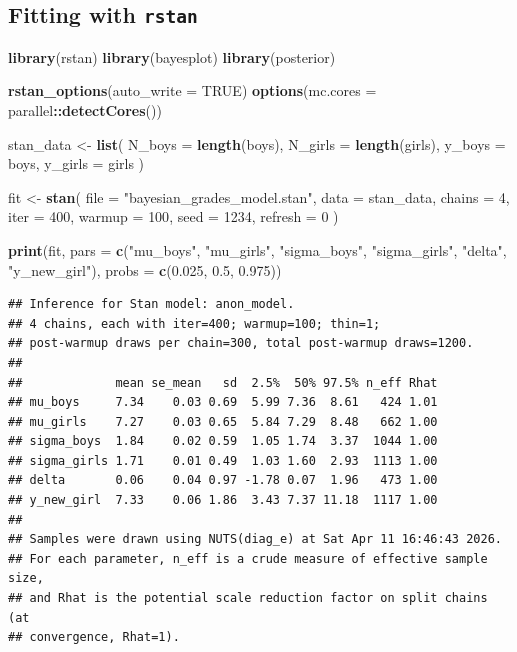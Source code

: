 \documentclass[
  english,
  12pt,
]{article}
\newenvironment{Shaded}{\begin{snugshade}}{\end{snugshade}}
\newcommand{\AttributeTok}[1]{\textcolor[rgb]{0.13,0.29,0.53}{#1}}
\newcommand{\ConstantTok}[1]{\textcolor[rgb]{0.56,0.35,0.01}{#1}}
\newcommand{\DecValTok}[1]{\textcolor[rgb]{0.00,0.00,0.81}{#1}}
\newcommand{\FloatTok}[1]{\textcolor[rgb]{0.00,0.00,0.81}{#1}}
\newcommand{\FunctionTok}[1]{\textcolor[rgb]{0.13,0.29,0.53}{\textbf{#1}}}
\newcommand{\NormalTok}[1]{#1}
\newcommand{\OtherTok}[1]{\textcolor[rgb]{0.56,0.35,0.01}{#1}}
\newcommand{\SpecialCharTok}[1]{\textcolor[rgb]{0.81,0.36,0.00}{\textbf{#1}}}
\newcommand{\StringTok}[1]{\textcolor[rgb]{0.31,0.60,0.02}{#1}}
\begin{document}
\subsection{\texorpdfstring{Fitting with
\texttt{rstan}}{Fitting with rstan}}\label{fitting-with-rstan}

\begin{Shaded}
\begin{Highlighting}[]
\FunctionTok{library}\NormalTok{(rstan)}
\FunctionTok{library}\NormalTok{(bayesplot)}
\FunctionTok{library}\NormalTok{(posterior)}

\FunctionTok{rstan\_options}\NormalTok{(}\AttributeTok{auto\_write =} \ConstantTok{TRUE}\NormalTok{)}
\FunctionTok{options}\NormalTok{(}\AttributeTok{mc.cores =}\NormalTok{ parallel}\SpecialCharTok{::}\FunctionTok{detectCores}\NormalTok{())}

\NormalTok{stan\_data }\OtherTok{\textless{}{-}} \FunctionTok{list}\NormalTok{(}
  \AttributeTok{N\_boys  =} \FunctionTok{length}\NormalTok{(boys),}
  \AttributeTok{N\_girls =} \FunctionTok{length}\NormalTok{(girls),}
  \AttributeTok{y\_boys  =}\NormalTok{ boys,}
  \AttributeTok{y\_girls =}\NormalTok{ girls}
\NormalTok{)}

\NormalTok{fit }\OtherTok{\textless{}{-}} \FunctionTok{stan}\NormalTok{(}
  \AttributeTok{file =} \StringTok{"bayesian\_grades\_model.stan"}\NormalTok{,}
  \AttributeTok{data =}\NormalTok{ stan\_data,}
  \AttributeTok{chains =} \DecValTok{4}\NormalTok{,}
  \AttributeTok{iter =} \DecValTok{400}\NormalTok{,}
  \AttributeTok{warmup =} \DecValTok{100}\NormalTok{,}
  \AttributeTok{seed =} \DecValTok{1234}\NormalTok{,}
  \AttributeTok{refresh =} \DecValTok{0}
\NormalTok{)}

\FunctionTok{print}\NormalTok{(fit, }\AttributeTok{pars =} \FunctionTok{c}\NormalTok{(}\StringTok{"mu\_boys"}\NormalTok{, }\StringTok{"mu\_girls"}\NormalTok{, }\StringTok{"sigma\_boys"}\NormalTok{, }\StringTok{"sigma\_girls"}\NormalTok{, }\StringTok{"delta"}\NormalTok{, }\StringTok{"y\_new\_girl"}\NormalTok{),}
      \AttributeTok{probs =} \FunctionTok{c}\NormalTok{(}\FloatTok{0.025}\NormalTok{, }\FloatTok{0.5}\NormalTok{, }\FloatTok{0.975}\NormalTok{))}
\end{Highlighting}
\end{Shaded}

\begin{verbatim}
## Inference for Stan model: anon_model.
## 4 chains, each with iter=400; warmup=100; thin=1; 
## post-warmup draws per chain=300, total post-warmup draws=1200.
## 
##             mean se_mean   sd  2.5%  50% 97.5% n_eff Rhat
## mu_boys     7.34    0.03 0.69  5.99 7.36  8.61   424 1.01
## mu_girls    7.27    0.03 0.65  5.84 7.29  8.48   662 1.00
## sigma_boys  1.84    0.02 0.59  1.05 1.74  3.37  1044 1.00
## sigma_girls 1.71    0.01 0.49  1.03 1.60  2.93  1113 1.00
## delta       0.06    0.04 0.97 -1.78 0.07  1.96   473 1.00
## y_new_girl  7.33    0.06 1.86  3.43 7.37 11.18  1117 1.00
## 
## Samples were drawn using NUTS(diag_e) at Sat Apr 11 16:46:43 2026.
## For each parameter, n_eff is a crude measure of effective sample size,
## and Rhat is the potential scale reduction factor on split chains (at 
## convergence, Rhat=1).
\end{verbatim}
\end{document}
